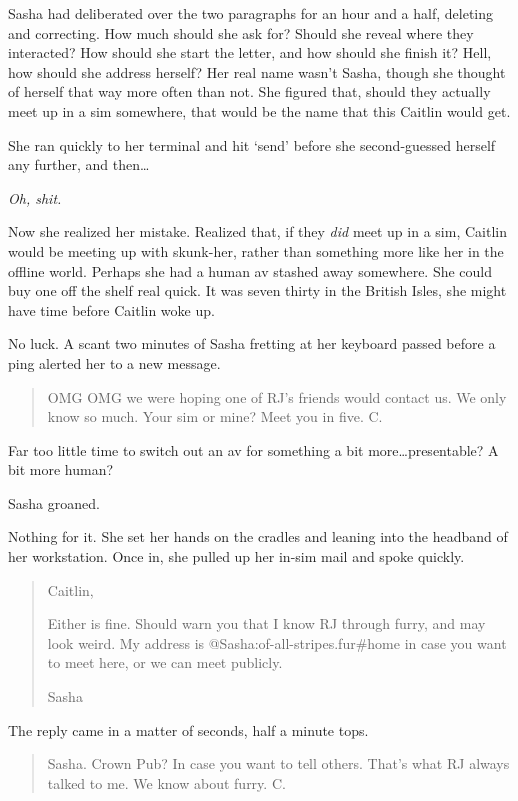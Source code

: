 Sasha had deliberated over the two paragraphs for an hour and a half, deleting and correcting. How much should she ask for? Should she reveal where they interacted? How should she start the letter, and how should she finish it? Hell, how should she address herself? Her real name wasn't Sasha, though she thought of herself that way more often than not. She figured that, should they actually meet up in a sim somewhere, that would be the name that this Caitlin would get.

She ran quickly to her terminal and hit `send' before she second-guessed herself any further, and then\ldots{}

\emph{Oh, shit.}

Now she realized her mistake. Realized that, if they \emph{did} meet up in a sim, Caitlin would be meeting up with skunk-her, rather than something more like her in the offline world. Perhaps she had a human av stashed away somewhere. She could buy one off the shelf real quick. It was seven thirty in the British Isles, she might have time before Caitlin woke up.

No luck. A scant two minutes of Sasha fretting at her keyboard passed before a ping alerted her to a new message.

\begin{quote}
OMG OMG we were hoping one of RJ's friends would contact us. We only know so much. Your sim or mine? Meet you in five. C.
\end{quote}

Far too little time to switch out an av for something a bit more\ldots{}presentable? A bit more human?

Sasha groaned.

Nothing for it. She set her hands on the cradles and leaning into the headband of her workstation. Once in, she pulled up her in-sim mail and spoke quickly.

\begin{quote}
Caitlin,

Either is fine. Should warn you that I know RJ through furry, and may look weird. My address is @Sasha:of-all-stripes.fur\#home in case you want to meet here, or we can meet publicly.

Sasha
\end{quote}

The reply came in a matter of seconds, half a minute tops.

\begin{quote}
Sasha. Crown Pub? In case you want to tell others. That's what RJ always talked to me. We know about furry. C.
\end{quote}

